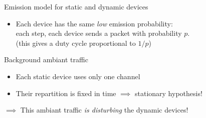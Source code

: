 \begin{frameO}[Hypotheses ($1/2$)]

    \begin{colorblock}{Emission model for static and dynamic devices}

        \begin{itemize}
            \item
                  Each device has the same \emph{low} emission probability: \\
                  each step, each device sends a packet with probability \(p\).
                  \\
                  \hfill{}\small{(this gives a duty cycle proportional to $1/p$)}
        \end{itemize}

    \end{colorblock}

    \vspace*{20pt}

    \begin{lightblock}{Background ambiant traffic}

        \begin{itemize}
            \item
                  Each static device uses only one channel
            \item
                  Their repartition is fixed in time \hfill{} $\implies$ \alert{stationary} hypothesis!
        \end{itemize}

        \(\implies\) This ambiant traffic \emph{is disturbing} the dynamic devices!
    \end{lightblock}

\end{frameO}

